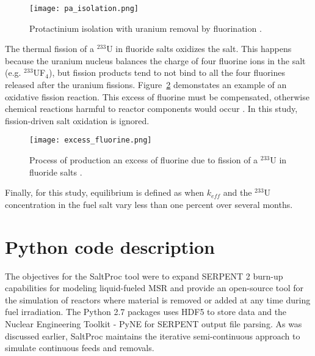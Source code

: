 \begin{figure}[hbp!] %
  \centering
  \vspace{-0.3em}
  \texttt{[image: pa\_isolation.png]}
  \caption{Protactinium isolation with uranium removal by fluorination \cite{robertson_conceptual_1971}.}
  \vspace{-0.6em}
  \label{fig:pa_isolation}
\end{figure}
\FloatBarrier

The thermal fission of a $^{233}$U in fluoride salts oxidizes the salt. This happens because the uranium nucleus balances the charge of four fluorine ions in the salt (e.g. $^{233}$UF$_4$), but fission products tend to not bind to all the four fluorines released after the uranium fissions. Figure~\ref{fig:excess_fluorine} demonstates an example of an oxidative fission reaction. This excess of fluorine must be compensated, otherwise chemical reactions harmful to reactor components would occur \cite{ridley_method_2017}. In this study, fission-driven salt oxidation is ignored.

\begin{figure}[htp!] %
  \centering
  \vspace{-0.3em}
  \texttt{[image: excess\_fluorine.png]}
  \caption{Process of production an excess of fluorine due to fission of a $^{233}$U in fluoride salts \cite{ridley_method_2017}.}
  \vspace{-0.6em}
  \label{fig:excess_fluorine}
\end{figure}
\FloatBarrier

Finally, for this study, equilibrium is defined as when $k_{eff}$ and the $^{233}$U concentration in the fuel salt vary less than one percent over several months. 

\section{Python code description}
The objectives for the SaltProc tool were to expand SERPENT 2 burn-up capabilities for modeling liquid-fueled \gls{MSR} and provide an open-source tool for the simulation of reactors where material is removed or added at any time during fuel irradiation. The Python 2.7 packages uses HDF5 \cite{the_hdf_group_hierarchical_nodate} to store data and the Nuclear Engineering Toolkit - PyNE \cite{scopatz_pyne:_2012} for SERPENT output file parsing. As was discussed earlier, SaltProc maintains the iterative semi-continuous approach to simulate continuous feeds and removals.

